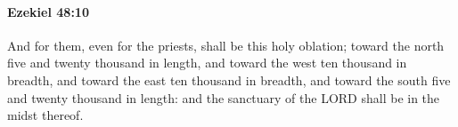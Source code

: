
		\paragraph{Ezekiel 48:10} %
			\label{EZEKIEL-48-10}

			And for them, even for the priests, shall be this holy oblation; toward the north five and twenty thousand in length, and toward the west ten thousand in breadth, and toward the east ten thousand in breadth, and toward the south five and twenty thousand in length: and the sanctuary of the LORD shall be in the midst thereof.


